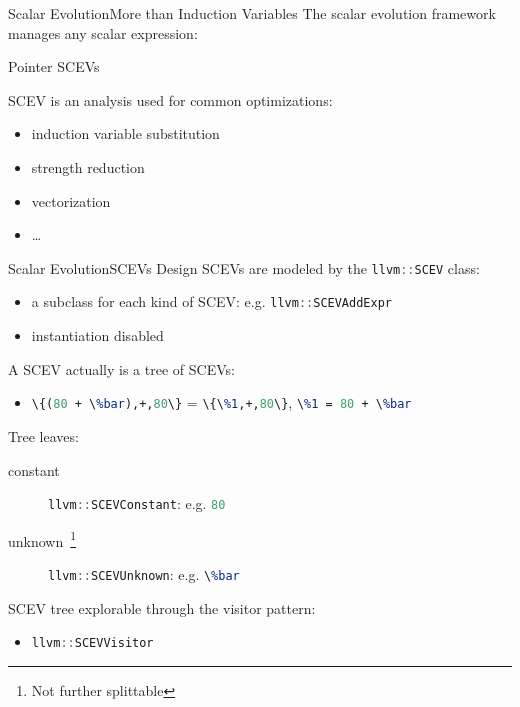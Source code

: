 \documentclass[10pt,mathserif]{beamer}
\newcommand{\cppinline}[1]{\lstinline[language=C++]!#1!}
\newcommand{\llvminput}[1]{}
\newcommand{\llvminline}[1]{\lstinline[language=LLVM]!#1!}
\begin{document}
\begin{frame}{Scalar Evolution}{More than Induction Variables}
The scalar evolution framework manages \alert{any scalar expression}:

\begin{block}{Pointer SCEVs}
\centering
\llvminput{snippet/02/nested-scev-pointer.ll}
\end{block}

SCEV is an analysis used for common optimizations:

\begin{itemize}
\item induction variable substitution
\item strength reduction
\item vectorization
\item \ldots
\end{itemize}
\end{frame}

\begin{frame}{Scalar Evolution}{SCEVs Design}
SCEVs are modeled by the \cppinline{llvm::SCEV} class:

\begin{itemize}
\item a subclass for each kind of SCEV: e.g. \cppinline{llvm::SCEVAddExpr}
\item instantiation disabled
\end{itemize}

A SCEV actually is a tree of SCEVs:

\begin{itemize}
\item \llvminline{\{(80 + \%bar),+,80\}} = \llvminline{\{\%1,+,80\}},
      \llvminline{\%1 = 80 + \%bar}
\end{itemize}

Tree leaves:

\begin{description}
\item[constant] \cppinline{llvm::SCEVConstant}: e.g. \llvminline{80}
\item[unknown~\footnote{Not further splittable}] \cppinline{llvm::SCEVUnknown}:
                                                 e.g. \llvminline{\%bar}
\end{description}

SCEV tree explorable through the visitor pattern:

\begin{itemize}
\item \cppinline{llvm::SCEVVisitor}
\end{itemize}
\end{frame}
\end{document}
